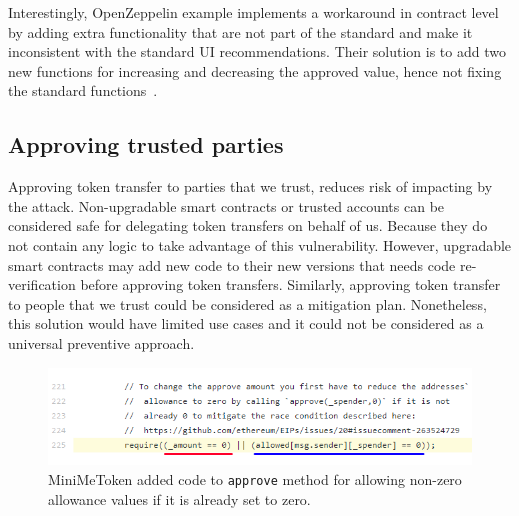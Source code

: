 Interestingly, OpenZeppelin example implements a workaround in contract level by adding extra functionality that are not part of the standard and make it inconsistent with the standard UI recommendations. Their solution is to add two new functions for increasing and decreasing the approved value, hence not fixing the standard functions~\cite{Ref10}.


\subsection{Approving trusted parties}
Approving token transfer to parties that we trust, reduces risk of impacting by the attack. Non-upgradable smart contracts or trusted accounts can be considered safe for delegating token transfers on behalf of us. Because they do not contain any logic to take advantage of this vulnerability. However, upgradable smart contracts may add new code to their new versions that needs code re-verification before approving token transfers. Similarly, approving token transfer to people that we trust could be considered as a mitigation plan. Nonetheless, this solution would have limited use cases and it could not be considered as a universal preventive approach.

\begin{figure}[t]
	\centering
	\includegraphics[width=1.0\linewidth]{figures/multiple_withdrawal_06.png}
	\caption{MiniMeToken added code to \texttt{approve} method for allowing non-zero allowance values if it is already set to zero.\label{fig:mini}}
\end{figure}

